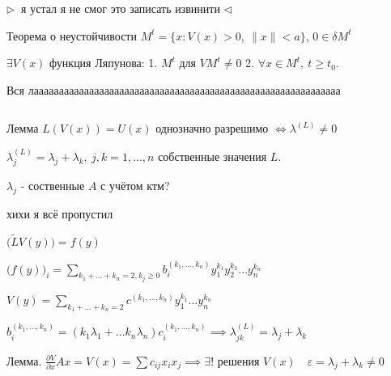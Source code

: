 \documentclass[12pt, a4paper]{article}
\begin{document}
    $\triangleright \ $ я устал я не смог это записать извинити $\triangleleft$

    Теорема о неустойчивости $M^t = \{ x: V(x) > 0, \ \| x\| < a \}$, $0 \in \delta M^t$

    $\exists V(x)$ функция Ляпунова: 1. $M^t$ для $V M^t \neq 0$ 2. $\forall x \in M^t, \ t \ge t_0$.

    Вся лааааааааааааааааааааааааааааааааааааааааааааааааааааааааааааа

    \par $ $

    Лемма $L(V(x)) = U(x)$ однозначно разрешимо $\iff \lambda^{(L)} \neq 0$

    $\lambda_j^{(L)} = \lambda_j + \lambda_k, \ j, k = 1,\dotsc, n$ собственные значения $L$. 

    $\lambda_j$ - соственные $A$ с учётом ктм?

    хихи я всё пропустил 
    
    $\Big( \widetilde{L} V(y) \Big) = f(y)$

    $\Big( f(y)\Big)_i = \sum_{k_1 + \dotsc + k_n = 2, k_j \ge 0} b_i^{(k_1, \dotsc, k_n)}y_1^{k_1}y_2^{k_2}\dotsc y_n^{k_n}$

    $V(y) = \sum_{k_1 + \dotsc + k_n = 2} c^{(k_1, \dotsc, k_n)}y_1^{k_1} \dotsc y_n^{k_n}$

    $b_i^{(k_1, \dotsc, k_n)} = (k_1 \lambda_1 + \dotsc k_n \lambda_n)c_i^{(k_1, \dotsc, k_n)} \implies 
    \lambda_{jk}^{(L)} = \lambda_j + \lambda_k$

    Лемма. $\frac{\partial V}{\partial x} Ax = V(x) = \sum c_{ij}x_i x_j \implies \exists ! $ решения $V(x) \quad \varepsilon = \lambda_j + \lambda_k \neq 0$
\end{document}
